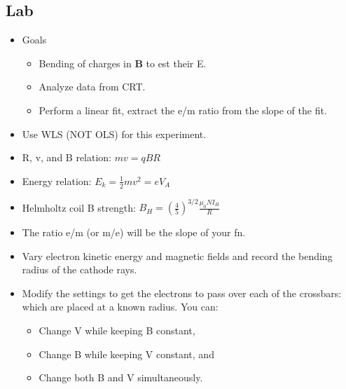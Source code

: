 \documentclass[twocolumn]{article}
\begin{document}

\subsection{Lab}
\begin{itemize}
    \item Goals
    \begin{itemize}
        \item Bending of charges in \textbf{B} to est their E.
        \item Analyze data from CRT.
        \item Perform a linear fit, extract the e/m ratio from the slope of the fit.
    \end{itemize}
    \item Use WLS (NOT OLS) for this experiment.
    \item R, v, and B relation: $mv = qBR$
    \item Energy relation: $E_k = \frac{1}{2}mv^2 = eV_A$
    \item Helmholtz coil B strength: $B_H = \left( \frac{4}{5} \right)^{3/2} \frac{\mu_0 NI_H}{R}$
    \item The ratio e/m (or m/e) will be the slope of your fn.
    \item Vary electron kinetic energy and magnetic fields and record the bending radius of the cathode rays.
    \item  Modify the settings to get the electrons to pass over each of the crossbars: which are placed at a known radius. You can:
    \begin{itemize}
        \item Change V while keeping B constant,
        \item Change B while keeping V constant, and
        \item Change both B and V simultaneously.
    \end{itemize}
\end{itemize}
\end{document}
